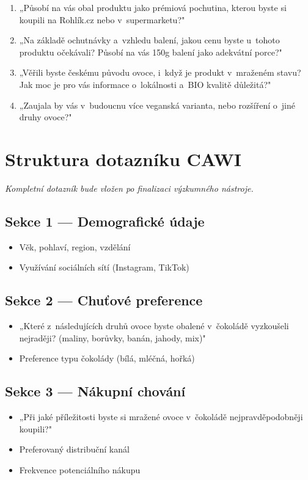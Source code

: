 \begin{enumerate}
  \item „Působí na vás obal produktu jako prémiová pochutina, kterou byste si koupili na Rohlík.cz nebo v~supermarketu?"
  \item „Na základě ochutnávky a~vzhledu balení, jakou cenu byste u~tohoto produktu očekávali? Působí na vás 150g balení jako adekvátní porce?"
  \item „Věřili byste českému původu ovoce, i~když je produkt v~mraženém stavu? Jak moc je pro vás informace o~lokálnosti a~BIO kvalitě důležitá?"
  \item „Zaujala by vás v~budoucnu více veganská varianta, nebo rozšíření o~jiné druhy ovoce?"
\end{enumerate}

\chapter{Struktura dotazníku CAWI}
\label{app:questionnaire}

\textit{Kompletní dotazník bude vložen po finalizaci výzkumného nástroje.}

\section*{Sekce 1 — Demografické údaje}
\begin{itemize}
  \item Věk, pohlaví, region, vzdělání
  \item Využívání sociálních sítí (Instagram, TikTok)
\end{itemize}

\section*{Sekce 2 — Chuťové preference}
\begin{itemize}
  \item „Které z~následujících druhů ovoce byste obalené v~čokoládě vyzkoušeli nejraději? (maliny, borůvky, banán, jahody, mix)"
  \item Preference typu čokolády (bílá, mléčná, hořká)
\end{itemize}

\section*{Sekce 3 — Nákupní chování}
\begin{itemize}
  \item „Při jaké příležitosti byste si mražené ovoce v~čokoládě nejpravděpodobněji koupili?"
  \item Preferovaný distribuční kanál
  \item Frekvence potenciálního nákupu
\end{itemize}

